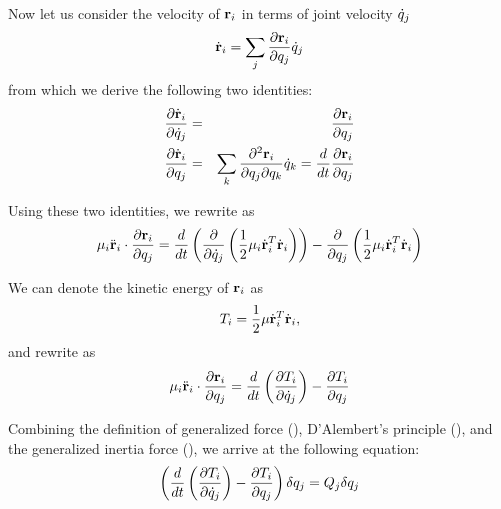 Now let us consider the velocity of $\mathbf{r}_i$ in terms of
joint velocity $\dot{q}_j$
\begin{equation}
\label{eq:velocity}
\dot{\mathbf{r}}_i = \sum_j \frac{\partial
  \mathbf{r}_i}{\partial q_j} \dot{q}_j
\end{equation}
from which we derive the following two identities:
\begin{eqnarray}
\frac{\partial \dot{\mathbf{r}}_i}{\partial \dot{q}_j} &=&
\frac{\partial \mathbf{r}_i}{\partial q_j}  \\
\frac{\partial \dot{\mathbf{r}}_i}{\partial q_j} &=&
\sum_k \frac{\partial^2 \mathbf{r}_i}{\partial q_j \partial
  q_k} \dot{q}_k = \frac{d}{dt} \frac{\partial \mathbf{r}_i}{\partial q_j}
\end{eqnarray}

Using these two identities, we rewrite  as
\begin{equation}
\label{eq:inertia_force2}
\mathbf{\mu}_i \ddot{\mathbf{r}}_i \cdot \frac{\partial \mathbf{r}_i}{\partial q_j}   = \frac{d}{dt} \left ( \frac{\partial}{\partial \dot{q}_j} \left( \frac{1}{2} \mathbf{\mu}_i \dot{\mathbf{r}}_i^{T} \dot{\mathbf{r}}_i\right) \right)
   - \frac{\partial}{\partial q_j} \left( \frac{1}{2} \mathbf{\mu}_i \dot{\mathbf{r}}_i^{T} \dot{\mathbf{r}}_i \right)
\end{equation}

We can denote the kinetic energy of $\mathbf{r}_i$ as
\begin{equation}\label{eq:kinetic_energy}
    T_i = \frac{1}{2} \mathbf{\mu} \dot{\mathbf{r}}_i^{T}
    \dot{\mathbf{r}}_i,
\end{equation}
and rewrite  as
\begin{equation}\label{eq:inertia_kinetic}
    \mathbf{\mu}_i \ddot{\mathbf{r}}_i \cdot \frac{\partial \mathbf{r}_i}{\partial
    q_j} = \frac{d}{dt} \left( \frac{\partial T_i}{\partial
    \dot{q}_j}\right) - \frac{\partial T_i}{\partial q_j}
\end{equation}

Combining the definition of generalized force (), D'Alembert's principle (), and the generalized inertia force (), we arrive at the following equation:
\begin{equation}\label{eq:dynamic_equil}
    \left ( \frac{d}{dt} \left( \frac{\partial T_i}{\partial \dot{q}_j} \right) - \frac{\partial T_i}{\partial
    q_j}\right ) \delta q_j = Q_{j} \delta
    q_j
\end{equation}


